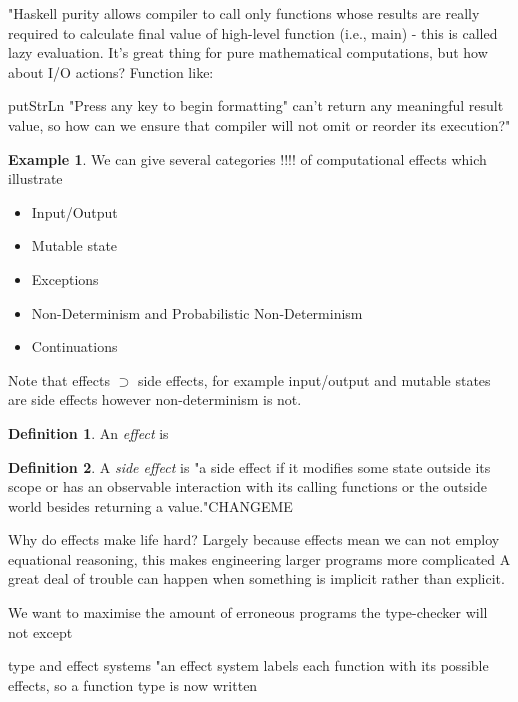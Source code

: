 \documentclass[a4paper,10pt]{article}
\theoremstyle{definition}
\newtheorem{definition}{Definition}[section]
\newtheorem{example}{Example}[section]
\begin{document}
"Haskell purity allows compiler to call only functions whose results are really required to calculate final value of high-level function (i.e., main) - this is called lazy evaluation. It's great thing for pure mathematical computations, but how about I/O actions? Function like:

putStrLn "Press any key to begin formatting"
can't return any meaningful result value, so how can we ensure that compiler will not omit or reorder its execution?"

\begin{example}
    We can give several categories !!!! of computational effects
    which illustrate
    \begin{itemize}
        \item Input/Output
        \item Mutable state
        \item Exceptions
        \item Non-Determinism and Probabilistic Non-Determinism
        \item Continuations
    \end{itemize}
\end{example}

Note that effects $\supset$ side effects,
for example input/output and mutable states are side effects
however non-determinism is not.
\begin{definition}
    An \textit{effect} is
\end{definition}

\begin{definition}
    A \textit{side effect} is
"a side effect if it modifies some state outside its scope or has an observable interaction with its calling functions or the outside world besides returning a value."CHANGEME
\cite{hughes1989functional}
\end{definition}

Why do effects make life hard?
Largely because effects mean we can not employ equational reasoning,
this makes engineering larger programs more complicated
A great deal of trouble can happen when something is implicit
rather than explicit.

We want to maximise the amount of erroneous programs the type-checker will not except

type and effect systems
\cite{nielson1999type}
"an effect system labels each function with its possible effects, so a function type is now written %
\end{document}
